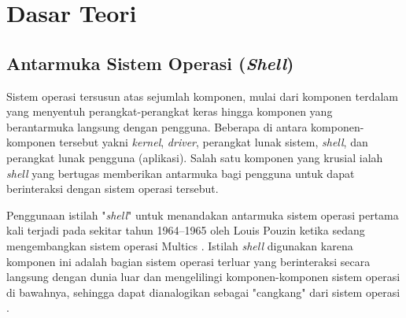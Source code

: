 \section{Dasar Teori}

\subsection{Antarmuka Sistem Operasi (\textit{Shell})}

Sistem operasi tersusun atas sejumlah komponen, mulai dari komponen terdalam yang menyentuh perangkat-perangkat keras hingga komponen yang berantarmuka langsung dengan pengguna. Beberapa di antara komponen-komponen tersebut yakni \textit{kernel}, \textit{driver}, perangkat lunak sistem, \textit{shell}, dan perangkat lunak pengguna (aplikasi). Salah satu komponen yang krusial ialah \textit{shell} yang bertugas memberikan antarmuka bagi pengguna untuk dapat berinteraksi dengan sistem operasi tersebut.

Penggunaan istilah "\textit{shell}" untuk menandakan antarmuka sistem operasi pertama kali terjadi pada sekitar tahun 1964--1965 oleh Louis Pouzin ketika sedang mengembangkan sistem operasi Multics \cite{origin-of-the-shell-name}. Istilah \textit{shell} digunakan karena komponen ini adalah bagian sistem operasi terluar yang berinteraksi secara langsung dengan dunia luar dan mengelilingi komponen-komponen sistem operasi di bawahnya, sehingga dapat dianalogikan sebagai "cangkang" dari sistem operasi \cite{shell-jargon-explanation}.

